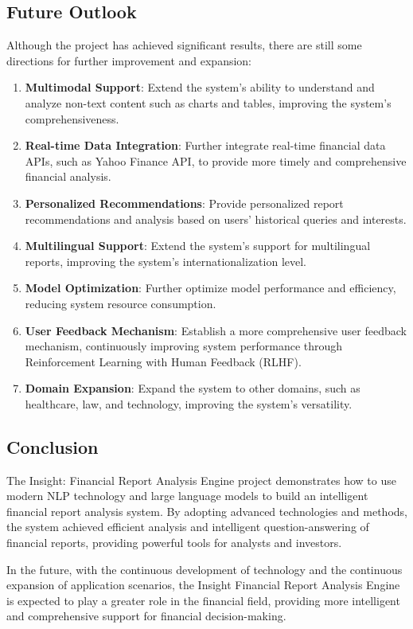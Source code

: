 \subsection{Future Outlook}

Although the project has achieved significant results, there are still some directions for further improvement and expansion:

\begin{enumerate}
\item \textbf{Multimodal Support}: Extend the system's ability to understand and analyze non-text content such as charts and tables, improving the system's comprehensiveness.

\item \textbf{Real-time Data Integration}: Further integrate real-time financial data APIs, such as Yahoo Finance API, to provide more timely and comprehensive financial analysis.

\item \textbf{Personalized Recommendations}: Provide personalized report recommendations and analysis based on users' historical queries and interests.

\item \textbf{Multilingual Support}: Extend the system's support for multilingual reports, improving the system's internationalization level.

\item \textbf{Model Optimization}: Further optimize model performance and efficiency, reducing system resource consumption.

\item \textbf{User Feedback Mechanism}: Establish a more comprehensive user feedback mechanism, continuously improving system performance through Reinforcement Learning with Human Feedback (RLHF).

\item \textbf{Domain Expansion}: Expand the system to other domains, such as healthcare, law, and technology, improving the system's versatility.
\end{enumerate}

\subsection{Conclusion}

The Insight: Financial Report Analysis Engine project demonstrates how to use modern NLP technology and large language models to build an intelligent financial report analysis system. By adopting advanced technologies and methods, the system achieved efficient analysis and intelligent question-answering of financial reports, providing powerful tools for analysts and investors.

In the future, with the continuous development of technology and the continuous expansion of application scenarios, the Insight Financial Report Analysis Engine is expected to play a greater role in the financial field, providing more intelligent and comprehensive support for financial decision-making.
